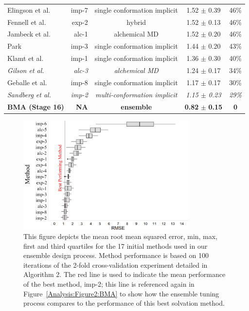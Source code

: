 \documentclass[journal=jpcbfk, manuscript=article]{achemso}
\newcommand{\+}[1]{\ensuremath{\mathbf{#1}}}
\begin{document}
\begin{table}[t]
\begin{tabular}{l|r|c|c|c}
		Elingson et al.~\cite{Ellingson:2014} & imp-7  & single conformation implicit & 1.52 $\pm$ 0.39 & 46\%\\
		Fennell et al.~\cite{Li:2014} & exp-2  & hybrid & 1.52 $\pm$ 0.13 & 46\%\\																
		Jambeck et al.~\cite{Jambeck:2013} & alc-1  & alchemical MD & 1.52 $\pm$ 0.20 & 46\%\\ 
		Park~\cite{Park:2014} & imp-3  & single conformation implicit & 1.44 $\pm$ 0.20 & 43\%\\
		Klamt et al.~\cite{Klamt:2010} & imp-1  & single conformation implicit & 1.36 $\pm$ 0.30 & 40\%\\	
		\textit{Gilson et al.~\cite{Muddana:2014}} & \textit{alc-3}  & \textit{alchemical MD} & {1.24 $\pm$ 0.17} & {34\%} \\ 
		Geballe et al.~\cite{Ellingson:2014} & imp-8  & single conformation implicit & 1.17 $\pm$ 0.17 & 30\%\\
		\textit{Sandberg et al.~\cite{Sandberg:2013}} & \textit{imp-2}  & \textit{multi-conformation implicit} & \textit{1.15 $\pm$ 0.23} & \textit{29\%}\\
		\textbf{BMA (Stage 16)} & \textbf{NA} & \textbf{ensemble} & \textbf{0.82} $\pm$ \textbf{0.15} & \textbf{0} \\
		\hline
	\end{tabular}
	\label{Analysis:Table1:Methods}
\end{table}
\begin{figure}[h!]
	\centering
	\includegraphics[keepaspectratio,width=0.8\textwidth]{Figures/Component_Model_RMSE}
	\caption{This figure depicts the mean root mean squared error, min, max, first and third quartiles for the 17 initial methods used in our ensemble design process.
	Method performance is based on 100 iterations of the 2-fold cross-validation experiment detailed in Algorithm 2.
	The red line is used to indicate the mean performance of the best method, imp-2; this line is referenced again in Figure~\ref{Analysis:Figure2:BMA} to show how the ensemble tuning process compares to the performance of this best solvation method.}
	\label{Analysis:Figure1:Methods}
\end{figure}
 
\end{document}
